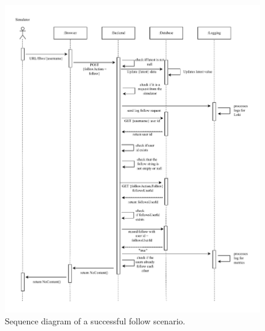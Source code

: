 \begin{figure}[t!]
  \begin{center}
\includegraphics[width=\textwidth]{images/figures/Sequence-api.pdf}
    \caption{Sequence diagram of a successful follow scenario.}
    \label{fig:seqapi}
  \end{center}
\end{figure}